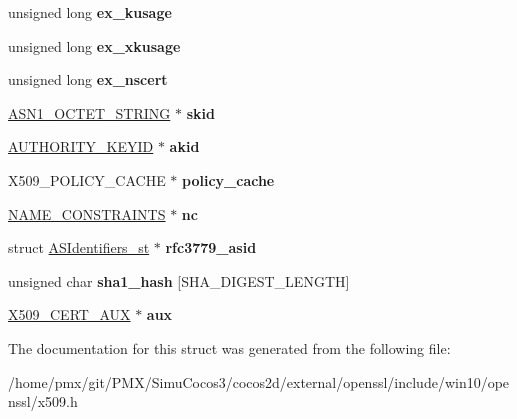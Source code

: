 \begin{DoxyCompactItemize}
\mbox{\label{structx509__st_aa22af4cd664504cf5d8f910bc2dc4caf}} 
unsigned long {\bfseries ex\+\_\+kusage}
\item 
\mbox{\label{structx509__st_a476d2351651a42fae4b5a8cf9d67ae8e}} 
unsigned long {\bfseries ex\+\_\+xkusage}
\item 
\mbox{\label{structx509__st_ae26ccfc73c4ca44fc360d90c894f321c}} 
unsigned long {\bfseries ex\+\_\+nscert}
\item 
\mbox{\label{structx509__st_a6ebe771c246586c77c91f2deca26b84d}} 
\hyperlink{structasn1__string__st}{A\+S\+N1\+\_\+\+O\+C\+T\+E\+T\+\_\+\+S\+T\+R\+I\+NG} $\ast$ {\bfseries skid}
\item 
\mbox{\label{structx509__st_a0e11914f6c1933ca2734bea95f06cf78}} 
\hyperlink{structAUTHORITY__KEYID__st}{A\+U\+T\+H\+O\+R\+I\+T\+Y\+\_\+\+K\+E\+Y\+ID} $\ast$ {\bfseries akid}
\item 
\mbox{\label{structx509__st_af85ce8a268304c4850f30343b17c018c}} 
X509\+\_\+\+P\+O\+L\+I\+C\+Y\+\_\+\+C\+A\+C\+HE $\ast$ {\bfseries policy\+\_\+cache}
\item 
\mbox{\label{structx509__st_a1f79b4f8402d962b6cee671e70c9b661}} 
\hyperlink{structNAME__CONSTRAINTS__st}{N\+A\+M\+E\+\_\+\+C\+O\+N\+S\+T\+R\+A\+I\+N\+TS} $\ast$ {\bfseries nc}
\item 
\mbox{\label{structx509__st_a0a127b4d4820f45ad31d8b565c9d6341}} 
struct \hyperlink{structASIdentifiers__st}{A\+S\+Identifiers\+\_\+st} $\ast$ {\bfseries rfc3779\+\_\+asid}
\item 
\mbox{\label{structx509__st_a5f14592600ea066dea895667d98f8614}} 
unsigned char {\bfseries sha1\+\_\+hash} \mbox{[}S\+H\+A\+\_\+\+D\+I\+G\+E\+S\+T\+\_\+\+L\+E\+N\+G\+TH\mbox{]}
\item 
\mbox{\label{structx509__st_aa65a773dc5963a057790ccc63ca0a169}} 
\hyperlink{structx509__cert__aux__st}{X509\+\_\+\+C\+E\+R\+T\+\_\+\+A\+UX} $\ast$ {\bfseries aux}
\end{DoxyCompactItemize}


The documentation for this struct was generated from the following file\+:\begin{DoxyCompactItemize}
\item 
/home/pmx/git/\+P\+M\+X/\+Simu\+Cocos3/cocos2d/external/openssl/include/win10/openssl/x509.\+h\end{DoxyCompactItemize}
